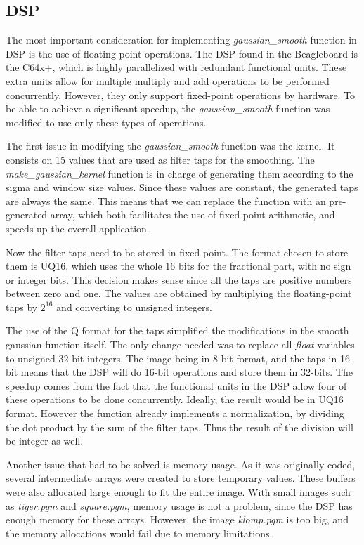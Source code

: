\subsection{DSP}
The most important consideration for implementing \textit{gaussian\_smooth} function in DSP is the use of floating point operations. The DSP found in the Beagleboard is the C64x+, which is highly parallelized with redundant functional units. These extra units allow for multiple multiply and add operations to be performed concurrently. However, they only support fixed-point operations by hardware. To be able to achieve a significant speedup, the \textit{gaussian\_smooth} function was modified to use only these types of operations.

The first issue in modifying the \textit{gaussian\_smooth} function was the kernel. It consists on 15 values that are used as filter taps for the smoothing. The \textit{make\_gaussian\_kernel} function is in charge of generating them according to the sigma and window size values. Since these values are constant, the generated taps are always the same. This means that we can replace the function with an pre-generated array, which both facilitates the use of fixed-point arithmetic, and speeds up the overall application.

Now the filter taps need to be stored in fixed-point. The format chosen to store them is UQ16, which uses the whole 16 bits for the fractional part, with no sign or integer bits. This decision makes sense since all the taps are positive numbers between zero and one. The values are obtained by multiplying the floating-point taps by $2^{16}$ and converting to unsigned integers.

The use of the Q format for the taps simplified the modifications in the smooth gaussian function itself. The only change needed was to replace all \textit{float} variables to unsigned 32 bit integers. The image being in 8-bit format, and the taps in 16-bit means that the DSP will do 16-bit operations and store them in 32-bits.  The speedup comes from the fact that the functional units in the DSP allow four of these operations to be done concurrently. Ideally, the result would be in UQ16 format. However the function already implements a normalization, by dividing the dot product by the sum of the filter taps. Thus the result of the division will be integer as well.

Another issue that had to be solved is memory usage. As it was originally coded, several intermediate arrays were created to store temporary values. These buffers were also allocated large enough to fit the entire image. With small images such as \textit{tiger.pgm} and \textit{square.pgm}, memory usage is not a problem, since the DSP has enough memory for these arrays. However, the image \textit{klomp.pgm} is too big, and the memory allocations would fail due to memory limitations.

